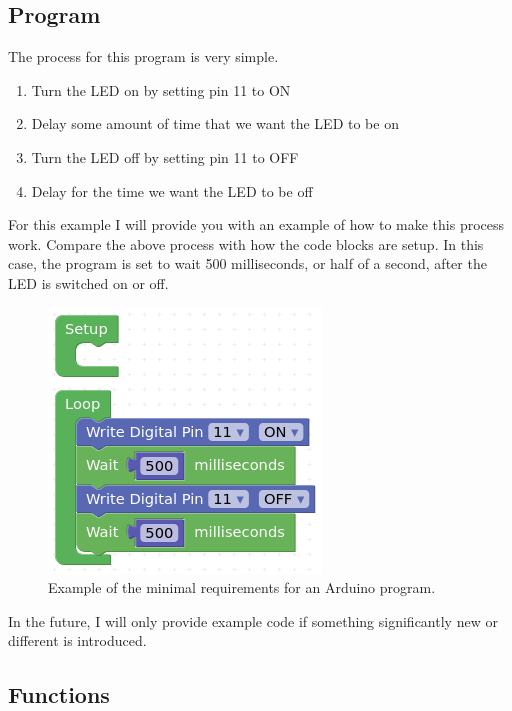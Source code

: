 \documentclass[12pt]{article}
\begin{document}
	\subsection{Program}
	
	The process for this program is very simple.
	
	\begin{enumerate}
		\itemsep -1em
		\item Turn the LED on by setting pin 11 to ON
		\item Delay some amount of time that we want the LED to be on
		\item Turn the LED off by setting pin 11 to OFF
		\item Delay for the time we want the LED to be off
	\end{enumerate}

	For this example I will provide you with an example of how to make this process work. Compare the above process with how the code blocks are setup. In this case, the program is set to wait 500 milliseconds, or half of a second, after the LED is switched on or off.
	
	\begin{figure}[H]
		\begin{center}
			\includegraphics[scale=0.7]{p_blink}
			\caption{Example of the minimal requirements for an Arduino program.}
			\label{prog:blink}
		\end{center}
	\end{figure}
	
	In the future, I will only provide example code if something significantly new or different is introduced.
	
	\subsection{Functions}
	
\end{document}

